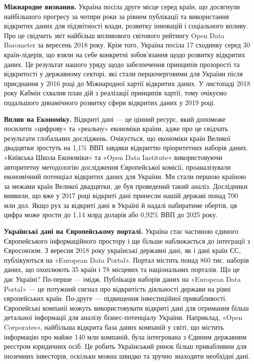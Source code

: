 \textbf{Міжнародне визнання.}
Україна посіла друге місце серед країн, що досягнули найбільшого прогресу за чотири роки за
рівнем публікації та використання відкритих даних для підзвітності влади, розвитку
інновацій і соціального впливу. Про це свідчить звіт найбільш впливового світового рейтингу
Open Data Barometer за вересень 2018 року. Крім того, Україна посіла 17 сходинку серед 30
країн-лідерів, що взяли на себе конкретні зобов’язання щодо розвитку відкритих даних.
Це результат нашого уряду щодо забезпечення принципів прозорості та відкритості у державному
секторі, які стали першочерговими для України після приєднання у 2016 році до Міжнародної
хартії відкритих даних. У листопаді 2018 року Кабмін схвалив план дій з реалізації принципів
хартії, тому очікуємо подальшого динамічного розвитку сфери відкритих даних у 2019 році.

\textbf{Вплив на Економіку.}
Відкриті дані — це цінний ресурс, який допоможе посилити «цифрову» та «реальну» економіки країни, адже про це свідчать результати глобальних досліджень.
Очікується, що економіки країн Великої двадцятки зростуть на 1,1\% ВВП завдяки відкриттю пріоритетних наборів даних.
«Київська Школа Економіки» та «Open Data Institute» використовуючи авторитетну методологію дослідження Європейської комісії,
проаналізували економічний потенціал відкритих даних для України.
Ми стали першою країною за межами країн Великої двадцятки, де був проведений такий аналіз.
Дослідники виявили, що вже у 2017 році відкриті дані принесли нашій державі понад 700 млн дол.
Якщо рух за відкриті дані в Україні й надалі набиратиме обертів,
ця цифра може зрости до 1,14 млрд доларів або 0,92\% ВВП до 2025 року.

\textbf{Українські дані на Європейському порталі.}
Україна стає частиною єдиного Європейського інформаційного простору і ще більше наближається до інтеграції з Євросоюзом.
З вересня 2018 року українські державні дані, як і дані країн ЄС, публікуються на «European Data Portal».
Портал містить понад 860 тис. наборів даних, що охоплюють 35 країн і 78 місцевих та національних порталів.
Що це дає Україні? По-перше — імідж.
Публікація наборів даних на «European Data Portal» — це потужний сигнал про відкритість
діяльності держави на рівні європейських країн.
По-друге — підвищення інвестиційної привабливості.
Європейські компанії можуть використовувати відкриті дані для отримання більш
детальної інформації для аналізу бізнес-потенціалу України.
Наприклад, «Open Corporates», найбільша відкрита база даних компаній у світі,
що містить інформацію про майже 140 млн компаній, була інтегрована з Єдиним державним реєстром юридичних осіб.
Це робить Український ринок більш привабливим для іноземних інвесторів, оскільки можна
швидко та зручно знаходити необхідні дані.

